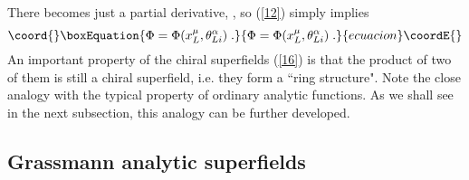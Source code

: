 \documentclass[a4paper,12pt]{article}
\begin{document}
There \coordHE{} becomes just a partial derivative, \coordHE{}, 
so (\ref{12}) simply implies
\begin{equation}\coord{}\boxEquation{\label{16}
  \Phi=\Phi(x^\mu_L,\theta^\alpha_{Li})\;.
}{\Phi=\Phi(x^\mu_L,\theta^\alpha_{Li})\;.
}{ecuacion}\coordE{}\end{equation}
An important property of the chiral superfields (\ref{16}) is that 
the product of two of them is still a chiral superfield, i.e. they 
form a ``ring structure". Note the close analogy with the typical 
property of ordinary analytic functions. As we shall see in the 
next subsection, this analogy can be further developed. 

\subsection{Grassmann analytic superfields}\label{gan}
\end{document}
